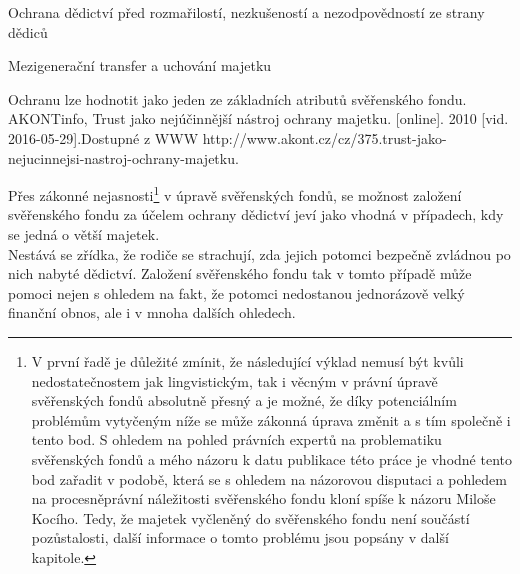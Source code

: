 \documentclass{article}
\begin{document}
 
 
 \begin{enumerate}
 {\Large\item Ochrana dědictví před rozmařilostí, nezkušeností a nezodpovědností ze strany dědiců}
 \item[1.] Mezigenerační transfer a uchování majetku
 \end{enumerate}
 
 Ochranu lze hodnotit jako jeden ze základních atributů svěřenského fondu. AKONTinfo, Trust jako nejúčinnější nástroj ochrany majetku. [online]. 2010 [vid. 2016-05-29].Dostupné z WWW http://www.akont.cz/cz/375.trust-jako-nejucinnejsi-nastroj-ochrany-majetku. 
 
 Přes zákonné nejasnosti\footnote{ V první řadě je důležité zmínit, že následující výklad nemusí být kvůli nedostatečnostem jak lingvistickým, tak i věcným v právní úpravě svěřenských fondů absolutně přesný a je možné, že díky potenciálním problémům vytyčeným níže se může zákonná úprava změnit a s tím společně i tento bod. S ohledem na pohled právních expertů na problematiku svěřenských fondů a mého názoru k datu publikace této práce je vhodné tento bod zařadit v podobě, která se s ohledem na názorovou disputaci a pohledem na procesněprávní náležitosti svěřenského fondu kloní spíše k názoru Miloše Kocího. Tedy, že majetek vyčleněný do svěřenského fondu není součástí pozůstalosti, další informace o tomto problému jsou popsány v další kapitole.} v úpravě svěřenských fondů, se možnost založení svěřenského fondu za účelem ochrany dědictví jeví jako vhodná v případech, kdy se jedná o větší majetek.\\
 
 Nestává se zřídka, že rodiče se strachují, zda jejich potomci bezpečně zvládnou po nich nabyté dědictví. Založení svěřenského fondu tak v tomto případě může pomoci nejen s ohledem na fakt, že potomci nedostanou jednorázově velký finanční obnos, ale i v mnoha dalších ohledech.\\
 
\end{document}
